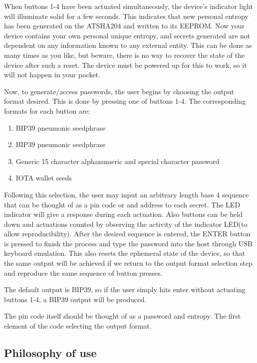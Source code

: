 \documentclass{article}
\begin{document}
When buttons 1-4 have been actuated simultaneously, the device's indicator light will illuminate solid for a few seconds. This indicates that new personal entropy has been generated on the ATSHA204 and written to its EEPROM. Now your device contains your own personal unique entropy, and secrets generated are not dependent on any information known to any external entity. This can be done as many times as you like, but beware, there is no way to recover the state of the device after such a reset. The device must be powered up for this to work, so it will not happen in your pocket. 

Now, to generate/access passwords, the user begins by choosing the output format desired. This is done by pressing one of buttons 1-4. The corresponding formats for each button are:

\begin{enumerate}
\item  BIP39 pneumonic seedphrase \cite{bip39}
\item  BIP39 pneumonic seedphrase \cite{bip39}
\item  Generic 15 character alphanumeric and special character password
\item  IOTA wallet seeds \cite{iota}
\end{enumerate}


Following this selection, the user may input an arbitrary length base 4 sequence that can be thought of as a pin code or and address to each secret. The LED indicator will give a response during each actuation. Also buttons can be held down and actuations counted by observing the activity of the indicator LED(to allow reproducibility). After the desired sequence is entered, the ENTER button is pressed to finish the process and type the password into the host through USB keyboard emulation. This also resets the ephemeral state of the device, so that the same output will be achieved if we return to the output format selection step and reproduce the same sequence of button presses.

The default output is BIP39, so if the user simply hits enter without actuating buttons 1-4, a BIP39 output will be produced. 

The pin code itself should be thought of as a password and entropy. The first element of the code selecting the output format. 

\subsection{Philosophy of use}
\end{document}
